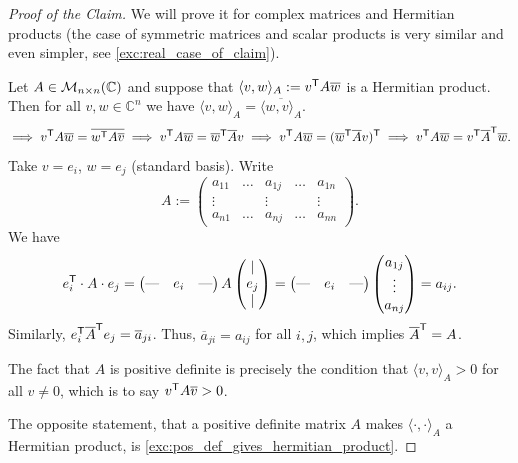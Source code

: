 \begin{proof}[Proof of the Claim]
    We will prove it for complex matrices and Hermitian products (the case of symmetric matrices and scalar products is very similar and even simpler, see \cref{exc:real_case_of_claim}).

    Let $A \in \mathcal{M}_{n \times n}(\mathbb{C})$ and suppose that $\langle v, w \rangle_A := v^{\mathsf{T}} A \overline{w}$ is a Hermitian product.
    Then for all $v, w \in \mathbb{C}^n$ we have $\langle v, w \rangle_A = \overline{\langle w, v \rangle_A}$.
    \[
        \implies v^{\mathsf{T}} A \overline{w} = \overline{w^{\mathsf{T}} A \overline{v}} \implies v^{\mathsf{T}} A \overline{w} = \overline{w}^{\mathsf{T}} \overline{A} v \implies v^{\mathsf{T}} A \overline{w} = (\overline{w}^{\mathsf{T}} \overline{A} v)^{\mathsf{T}} \implies v^{\mathsf{T}} A \overline{w} = v^{\mathsf{T}} \overline{A}^{\mathsf{T}} \overline{w}.
    \]
    Take $v = e_i$, $w = e_j$ (standard basis). Write
    \[
        A := \begin{pmatrix} a_{11} & \dots & a_{1j} & \dots & a_{1n} \\ \vdots & & \vdots & & \vdots \\ a_{n1} & \dots & a_{nj} & \dots & a_{nn} \end{pmatrix}.
    \]
    We have
    \[
        e_i^{\mathsf{T}} \cdot A \cdot e_j = \begin{pmatrix} \text{---} & e_i & \text{---} \end{pmatrix} A \begin{pmatrix} | \\ e_j \\ | \end{pmatrix} = \begin{pmatrix} \text{---} & e_i & \text{---} \end{pmatrix} \begin{pmatrix} a_{1j} \\ \vdots \\ a_{nj} \end{pmatrix} = a_{ij}.
    \]
    Similarly, $e_i^{\mathsf{T}} \overline{A}^{\mathsf{T}} e_j = \overline{a}_{ji}$.
    Thus, $\overline{a}_{ji} = a_{ij}$ for all $i, j$, which implies $\overline{A}^{\mathsf{T}} = A$.
    
    The fact that $A$ is positive definite is precisely the condition that $\langle v, v \rangle_A > 0$ for all $v \neq 0$, which is to say $v^{\mathsf{T}} A \overline{v} > 0$.
    
    The opposite statement, that a positive definite matrix $A$ makes $\langle \cdot, \cdot \rangle_A$ a Hermitian product, is \cref{exc:pos_def_gives_hermitian_product}.
\end{proof}

